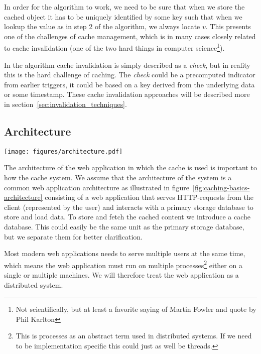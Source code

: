 
In order for the algorithm to work, we need to be sure that when we store the cached object it has to be uniquely identified by some key such that when we lookup the value as in step 2 of the algorithm, we always locate $v$. This presents one of the challenges of cache management, which is in many cases closely related to cache invalidation (one of the two hard things in computer science\footnote{Not scientifically, but at least a favorite saying of Martin Fowler and quote by Phil Karlton}).

In the algorithm cache invalidation is simply described as a \emph{check}, but in reality this is the hard challenge of caching. The \emph{check} could be a precomputed indicator from earlier triggers, it could be based on a key derived from the underlying data or some timestamp. These cache invalidation approaches will be described more in section~\ref{sec:invalidation_techniques}.

\subsection{Architecture}
\label{subsec:architecture}

\begin{figure*}[ht!]
  \centering
  \texttt{[image: figures/architecture.pdf]}
  \caption{The assumed architecture of the system}
  \label{fig:caching-basics-architecture}
\end{figure*}

The architecture of the web application in which the cache is used is important to how the cache system. We assume that the architecture of the system is a common web application architecture as illustrated in figure~\ref{fig:caching-basics-architecture} consisting of a web application that serves HTTP-requests from the client (represented by the user) and interacts with a primary storage database to store and load data. To store and fetch the cached content we introduce a cache database. This could easily be the same unit as the primary storage database, but we separate them for better clarification.

Most modern web applications needs to serve multiple users at the same time, which means the web application must run on multiple processes\footnote{This is processes as an abstract term used in distributed systems. If we need to be implementation specific this could just as well be threads.} either on a single or multiple machines. We will therefore treat the web application as a distributed system.

